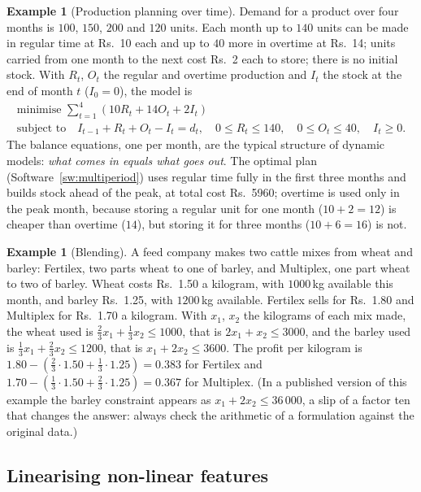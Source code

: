 \documentclass[11pt,a4paper]{article}
\numberwithin{equation}{section}
\theoremstyle{definition}
\newtheorem{exa}[thm]{Example}
\begin{document}
\begin{exa}[Production planning over time]
\label{ex:multiperiod}
Demand for a product over four months is $100$, $150$, $200$ and $120$ units. Each month up to $140$ units can be made in regular time at Rs.~10 each and up to $40$ more in overtime at Rs.~14; units carried from one month to the next cost Rs.~2 each to store; there is no initial stock. With $R_t$, $O_t$ the
regular and overtime production and $I_t$ the stock at the end of month $t$ ($I_0 = 0$), the model is
\begin{gather*}
\text{minimise } \sum_{t = 1}^4(10R_t + 14O_t + 2I_t) \\
\text{subject to}\quad I_{t - 1} + R_t + O_t - I_t = d_t, \quad 0 \leq R_t \leq 140, \quad 0 \leq O_t \leq 40, \quad I_t \geq 0 .
\end{gather*}
The balance equations, one per month, are the typical structure of dynamic models: \emph{what comes in equals what goes out}. The optimal plan (Software~\ref{sw:multiperiod}) uses regular time fully in the first three months and builds stock ahead of the peak, at total cost Rs.~5960; overtime is used only in the peak month,
because storing a regular unit for one month ($10 + 2 = 12$) is cheaper than overtime ($14$), but storing it for three months ($10 + 6 = 16$) is not.
\end{exa}

\begin{exa}[Blending]
\label{ex:feedmix}
A feed company makes two cattle mixes from wheat and barley: Fertilex, two parts wheat to one of barley, and Multiplex, one part wheat to two of barley. Wheat costs Rs.~1.50 a kilogram, with $1000$\,kg available this month, and barley Rs.~1.25, with $1200$\,kg available. Fertilex sells for Rs.~1.80 and
Multiplex for Rs.~1.70 a kilogram. With $x_1$, $x_2$ the kilograms of each mix made, the wheat used is $\frac23x_1 + \frac13x_2 \leq 1000$, that is $2x_1 + x_2 \leq 3000$, and the barley used is $\frac13x_1 + \frac23x_2 \leq 1200$, that is $x_1 + 2x_2 \leq 3600$. The profit per kilogram is
$1.80 - (\frac23\cdot 1.50 + \frac13\cdot 1.25) = 0.383$ for Fertilex and $1.70 - (\frac13\cdot 1.50 + \frac23\cdot 1.25) = 0.367$ for Multiplex. (In a published version of this example the barley constraint appears as $x_1 + 2x_2 \leq 36\,000$, a slip of a factor ten that changes the answer: always check the
arithmetic of a formulation against the original data.)
\end{exa}

\subsection{Linearising non-linear features}
\label{ssec:tricks}
\end{document}
